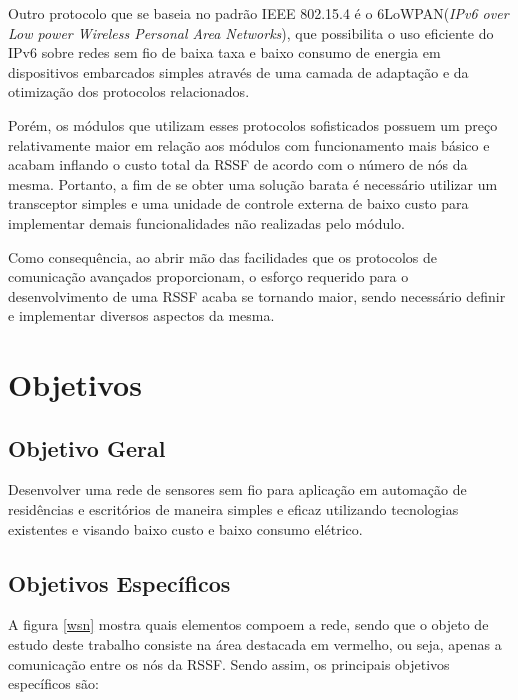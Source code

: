 \documentclass[
    12pt,               %
    a4paper,            %
    english,            %
    brazil,             %
    ]{article}
\begin{document}
Outro protocolo que se baseia no padrão IEEE 802.15.4 é o 6LoWPAN(\textit{IPv6 over Low power Wireless Personal Area Networks}),
que possibilita o uso eficiente do IPv6 sobre redes sem fio de baixa taxa e baixo consumo de energia em dispositivos embarcados
simples através de uma camada de adaptação e da otimização dos protocolos relacionados. \cite{shelby_bormann2009}

Porém, os módulos que utilizam esses protocolos sofisticados possuem um preço relativamente maior em relação aos módulos com
funcionamento mais básico e acabam inflando o custo total da RSSF de acordo com o número de nós da mesma. Portanto, a fim de se
obter uma solução barata é necessário utilizar um transceptor simples e uma unidade de controle externa de baixo custo para
implementar demais funcionalidades não realizadas pelo módulo.

Como consequência, ao abrir mão das facilidades que os protocolos de comunicação avançados proporcionam, o esforço requerido para
o desenvolvimento de uma RSSF acaba se tornando maior, sendo necessário definir e implementar diversos aspectos da mesma.

\section{Objetivos}


	\subsection{Objetivo Geral}

	Desenvolver uma rede de sensores sem fio para aplicação em automação de residências e escritórios de maneira simples e eficaz
	utilizando tecnologias existentes e visando baixo custo e baixo consumo elétrico.

	\subsection{Objetivos Específicos}

	A figura \ref{wsn} mostra quais elementos compoem a rede, sendo que o objeto de estudo deste trabalho consiste na área
	destacada em vermelho, ou seja, apenas a comunicação entre os nós da RSSF. Sendo assim, os principais objetivos específicos
	são:
\end{document}
